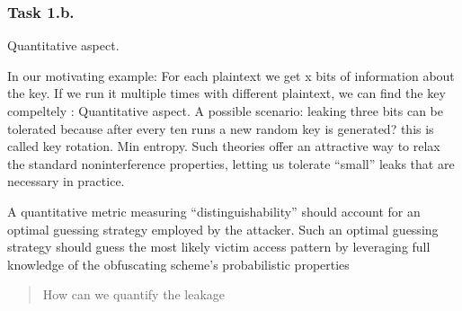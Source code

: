 \subsubsection{Task 1.b.} Quantitative aspect.

In our motivating example: For each plaintext we get x bits of information about the key. 
%
If we run it multiple times with different plaintext, we can find the key compeltely : Quantitative aspect.
%
A possible scenario: leaking three bits can be tolerated because after every ten runs a new random key is generated? this is called key rotation.
Min entropy.
Such theories offer an attractive way to relax the standard noninterference properties, letting us tolerate “small” leaks that are necessary in practice. 


A quantitative metric measuring “distinguishability”
should account for an optimal guessing strategy employed by the
attacker. Such an optimal guessing strategy should guess the most
likely victim access pattern by leveraging full knowledge of the
obfuscating scheme’s probabilistic properties


\begin{quote} 
    How can we quantify the leakage 
\end{quote}
